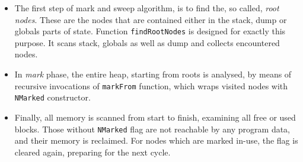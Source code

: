 \documentclass[12pt,a4paper]{report}
\begin{document}
\begin{itemize}
  \item The first step of mark and sweep algorithm, is to find the, so called,
    \textit{root nodes}. These are the nodes that are contained either in the
    stack, dump or globals parts of state. Function \texttt{findRootNodes} is
    designed for exactly this purpose. It scans stack, globals as well as dump
    and collects encountered nodes.
  \item In \textit{mark} phase, the entire heap, starting from roots is
    analysed, by means of recursive invocations of \texttt{markFrom} function,
    which wraps visited nodes with \texttt{NMarked} constructor.
  \item Finally, all memory is scanned from start to finish, examining all free
    or used blocks. Those without \texttt{NMarked} flag are not reachable
    by any program data, and their memory is reclaimed. For nodes which are
    marked in-use, the flag is cleared again, preparing for the next
    cycle.
\end{itemize}




\end{document}
